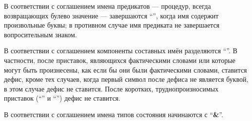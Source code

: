 В соответствии с соглашением имена предикатов --- процедур, всегда возвращающих
булево значение --- завершаются ``'', когда имя содержит произвольные буквы; в
противном случае имя предиката не завершается вопросительным знаком.

В соответствии с соглашением компоненты составных имён разделяются ``\ide{\bfseries -}''. В
частности, после приставок, являющихся фактическими словами или которые могут быть произнесены,
как если бы они были фактическими словами, ставится дефис, кроме тех случаев, когда первый
символ после дефиса не является буквой, в этом случае дефис не ставится. После коротких,
труднопроизносимых приставок (``'' и ``'') дефис не
ставится.

В соответствии с соглашением имена типов состояния начинаются с
``{\bfseries\cf\&}''.

